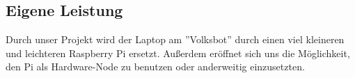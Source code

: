 \documentclass[12pt]{article}
\begin{document}
\subsection{Eigene Leistung}

Durch unser Projekt wird der Laptop am ''Volksbot'' durch einen viel kleineren und leichteren Raspberry Pi ersetzt. Außerdem eröffnet sich uns die Möglichkeit, den Pi als Hardware-Node zu benutzen oder anderweitig einzusetzten.




\end{document}
